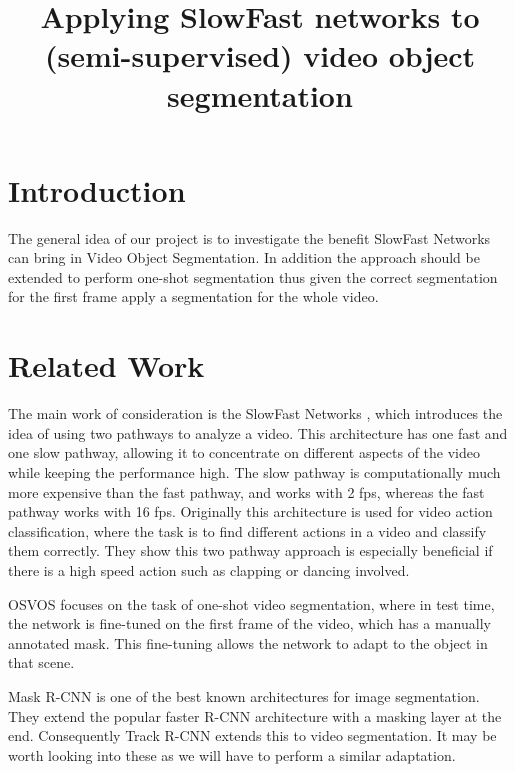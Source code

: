 \documentclass[conference]{IEEEtran}
\begin{document}
\title{Applying SlowFast networks to (semi-supervised) video object segmentation\\
}

\author{
\and
{}
}
\maketitle

\section{Introduction}
The general idea of our project is to investigate the benefit SlowFast Networks \cite{slow_fast} can bring in Video Object Segmentation. In addition the approach should be extended to perform one-shot segmentation thus given the correct segmentation for the first frame apply a segmentation for the whole video. 

\section{Related Work}
The main work of consideration is the SlowFast Networks \cite{slow_fast}, which introduces the idea of using two pathways to analyze a video. This architecture has one fast and one slow pathway, allowing it to concentrate on different aspects of the video while keeping the performance high. The slow pathway is computationally much more expensive than the fast pathway, and works with 2 fps, whereas the fast pathway works with 16 fps. Originally this architecture is used for video action classification, where the task is to find different actions in a video and classify them correctly. They show this two pathway approach is especially beneficial if there is a high speed action such as clapping or dancing involved.  

OSVOS \cite{osvos} focuses on the task of one-shot video segmentation, where in test time, the network is fine-tuned on the first frame of the video, which has a manually annotated mask. This fine-tuning allows the network to adapt to the object in that scene.

Mask R-CNN \cite{mask_rcnn} is one of the best known architectures for image segmentation. They extend the popular faster R-CNN architecture with a masking layer at the end. Consequently Track R-CNN \cite{track_rcnn} extends this to video segmentation. It may be worth looking into these as we will have to perform a similar adaptation.
\end{document}
